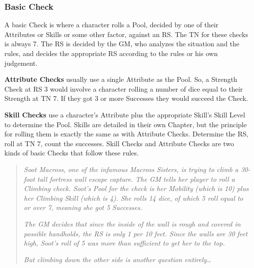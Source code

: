 \documentclass[oneside,11pt,english]{book}
\begin{document}
\subsubsection{Basic Check}
A basic Check is where a character rolls a Pool, decided by one of their Attributes or Skills or some other 
factor, against an RS. The TN for these checks is always 7. The RS is decided by the GM, who analyzes 
the situation and the rules, and decides the appropriate RS according to the rules or his own judgement.\par
\textbf{Attribute Checks} usually use a single Attribute as the Pool. So, a Strength Check at RS 3 would involve a 
character rolling a number of dice equal to their Strength at TN 7. If they got 3 or more Successes they 
would succeed the Check.\par
\textbf{Skill Checks} use a character’s Attribute plus the appropriate Skill’s Skill Level to determine the Pool. 
Skills are detailed in their own Chapter, but the principle for rolling them is exactly the same as with 
Attribute Checks. Determine the RS, roll at TN 7, count the successes. Skill Checks and Attribute Checks 
are two kinds of basic Checks that follow these rules.  
	\begin{quote}
			\emph{Soot Macross, one of the infamous Macross Sisters, is trying to climb a 30-foot tall fortress wall escape 
capture. The GM tells her player to roll a Climbing check. Soot’s Pool for the check is her Mobility 
(which is 10) plus her Climbing Skill (which is 4). She rolls 14 dice, of which 5 roll equal to or over 7, 
meaning she got 5 Successes.}

			\emph{The GM decides that since the inside of the wall is rough and covered in possible handholds, the RS is 
only 1 per 10 feet. Since the walls are 30 feet high, Soot’s roll of 5 was more than sufficient to get her to 
the top.} 

			\emph{But climbing down the other side is another question entirely… }
	\end{quote}
\end{document}

